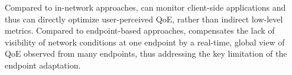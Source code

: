

Compared to in-network approaches, \ddn can monitor client-side applications
and thus can directly optimize user-perceived QoE, rather than indirect low-level 
metrics.
Compared to endpoint-based approaches,  \ddn compensates the lack of 
visibility of network conditions at one endpoint by a real-time, global view of 
QoE observed from many endpoints, thus addressing the key limitation of the 
endpoint adaptation. 



